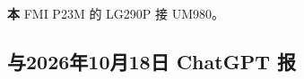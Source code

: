 \documentclass[11pt,a4paper]{article}
\numberwithin{equation}{section}
\numberwithin{figure}{section}
\begin{document}
\textbf{{\cjkfont 本}\allowbreak{}} FMI P23M {\cjkfont 的}\allowbreak{} LG290P {\cjkfont 接}\allowbreak{} UM980{\cjkfont 。}\allowbreak{}

\subsection{{\cjkfont 与}\allowbreak{}2026{\cjkfont 年}\allowbreak{}10{\cjkfont 月}\allowbreak{}18{\cjkfont 日}\allowbreak{} ChatGPT {\cjkfont 报}\allowbreak{}}
\end{document}
